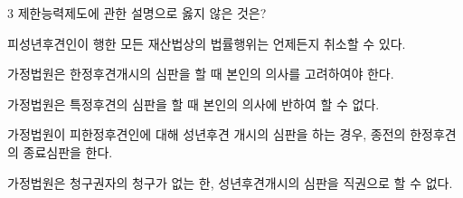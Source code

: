 \begin{question}{3}
제한능력제도에 관한 설명으로 옳지 않은 것은?
\begin{choices}
  \item 피성년후견인이 행한 모든 재산법상의 법률행위는 언제든지 취소할 수 있다.
  \item 가정법원은 한정후견개시의 심판을 할 때 본인의 의사를 고려하여야 한다.
  \item 가정법원은 특정후견의 심판을 할 때 본인의 의사에 반하여 할 수 없다.
  \item 가정법원이 피한정후견인에 대해 성년후견 개시의 심판을 하는 경우, 종전의 한정후견의 종료심판을 한다.
  \item 가정법원은 청구권자의 청구가 없는 한, 성년후견개시의 심판을 직권으로 할 수 없다.
\end{choices}
\end{question}
